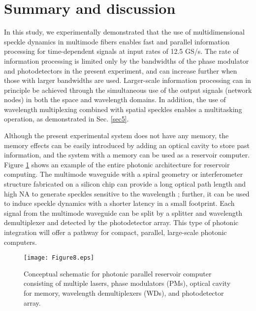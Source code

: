 \documentclass{article}
\begin{document}
\section{Summary and discussion}
%
In this study, we experimentally demonstrated that the use of multidimensional speckle
dynamics in multimode fibers 
enables fast and parallel information processing for time-dependent
signals at input rates of 12.5 GS/s. 
%
The rate of information processing is limited only by the bandwidths of the phase modulator and 
photodetectors in the present experiment, and can increase further when
those with larger bandwidths are used.   
%
Larger-scale information processing can in principle be 
achieved through the simultaneous use of the output signals (network nodes)
in both the space and wavelength domains.
%
In addition, the use of wavelength multiplexing combined with spatial
speckles enables a multitasking operation, as demonstrated in
Sec. \ref{sec5}.  

%
Although the present experimental system does not have any memory, the
memory effects can be easily introduced by adding an optical cavity to
store past information, and the system with a memory can be used as a
reservoir computer. 
%
Figure \ref{fig8} shows an example of the entire photonic architecture for reservoir computing. 
%
The multimode waveguide with a spiral geometry or interferometer
structure fabricated on a silicon chip can provide a long optical path
length and high NA to generate speckles sensitive to the wavelength
\cite{Piels2017, Redding2016, Paudel2019};
further, it can be used to induce speckle dynamics with a shorter latency in a small footprint. 
%
Each signal from the multimode waveguide can be split by a splitter
and wavelength demultiplexer and detected by the photodetector array. 
%
This type of photonic integration will offer a pathway for compact,
parallel, large-scale photonic computers.
%
\begin{figure}[htbp]
\centering\texttt{[image: Figure8.eps]}
\caption{\label{fig8}
Conceptual schematic for photonic parallel reservoir computer consisting
 of multiple lasers, phase modulators (PMs), optical cavity for memory,
 wavelength demultiplexers (WDs), and photodetector array. 
}
\end{figure}

\appendix
\end{document}
